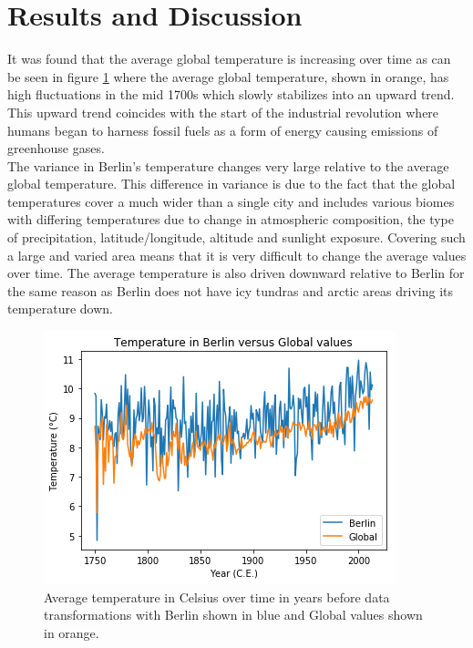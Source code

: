 \documentclass[journal, a4paper]{IEEEtran}
\begin{document}
\section{Results and Discussion}

	It was found that the average global temperature is increasing over time as can be seen in figure \ref{fig1} where the average global temperature, shown in orange, has high fluctuations in the mid 1700s which slowly stabilizes into an upward trend. This upward trend coincides with the start of the industrial revolution where humans began to harness fossil fuels as a form of energy causing emissions of greenhouse gases.\\
    
    The variance in Berlin's temperature changes very large relative to the average global temperature.
This difference in variance is due to the fact that the global temperatures cover a much wider than a single city and includes various biomes with differing temperatures due to change in atmospheric composition, the type of precipitation, latitude/longitude, altitude and sunlight exposure. Covering such a large and varied area means that it is very difficult to change the average values over time. The average temperature is also driven downward relative to Berlin for the same reason as Berlin does not have icy tundras and arctic areas driving its temperature down.\\

	\begin{figure}[!hbt]
		\begin{center}
		\includegraphics[width=\columnwidth]{AverageTemperaturePlot.png}
		\caption{Average temperature in Celsius over time in years before data transformations with Berlin shown in blue and Global values shown in orange.}
		\label{fig1}
		\end{center}
	\end{figure}
    
\end{document}
